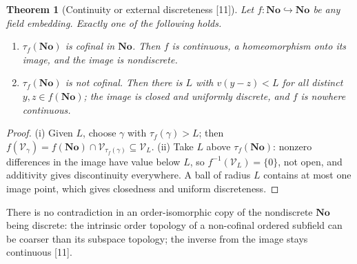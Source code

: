 \documentclass[11pt,oneside]{article}
\numberwithin{equation}{section}
\newtheorem{theorem}{Theorem}[section]
\theoremstyle{definition}
\theoremstyle{remark}
\newcommand{\No}{\mathbf{No}}
\newcommand{\src}[1]{\textup{\textsf{\small[#1]}}}
\begin{document}
\begin{theorem}[Continuity or external discreteness \src{11}]\label{opa:as:thm:topology}
Let $f:\No\hookrightarrow\No$ be any field embedding. Exactly one of the following holds.
\begin{enumerate}[label=\textup{(\roman*)},itemsep=1pt]
\item $\tau_f(\No)$ is cofinal in $\No$. Then $f$ is continuous, a homeomorphism onto its image, and the
image is nondiscrete.
\item $\tau_f(\No)$ is not cofinal. Then there is $L$ with $v(y-z)<L$ for all distinct $y,z\in f(\No)$; the
image is closed and uniformly discrete, and $f$ is nowhere continuous.
\end{enumerate}
\end{theorem}
\begin{proof}
(i) Given $L$, choose $\gamma$ with $\tau_f(\gamma)>L$; then $f(\mathcal V_\gamma)=f(\No)\cap\mathcal V_{\tau_f(\gamma)}
\subseteq\mathcal V_L$. (ii) Take $L$ above $\tau_f(\No)$: nonzero differences in the image have value below
$L$, so $f^{-1}(\mathcal V_L)=\{0\}$, not open, and additivity gives discontinuity everywhere. A ball of
radius $L$ contains at most one image point, which gives closedness and uniform discreteness.
\end{proof}

There is no contradiction in an order-isomorphic copy of the nondiscrete $\No$ being discrete: the intrinsic
order topology of a non-cofinal ordered subfield can be coarser than its subspace topology; the inverse
from the image stays continuous \src{11}.
\end{document}
